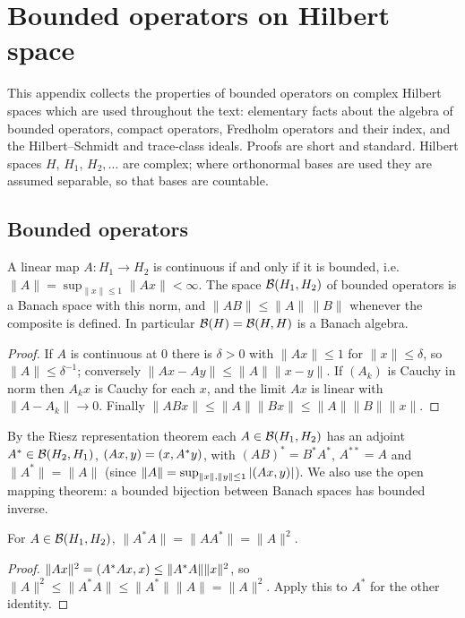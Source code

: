 \chapter{Bounded operators on Hilbert space}\label{ch:hilbert}

This appendix collects the properties of bounded operators on complex Hilbert
spaces which are used throughout the text: elementary facts about the algebra of
bounded operators, compact operators, Fredholm operators and their index, and the
Hilbert--Schmidt and trace-class ideals. Proofs are short and standard. Hilbert
spaces $H$, $H_1$, $H_2,\dots$ are complex; where orthonormal bases are used they are
assumed separable, so that bases are countable.

\section{Bounded operators}\label{hilbert:sec:bounded}

\begin{proposition}\label{hilbert:prop:bounded}
A linear map $A:H_1\to H_2$ is continuous if and only if it is bounded, i.e.\
$\|A\|=\sup_{\|x\|\le1}\|Ax\|<\infty$. The space $\mathcal{B}(H_1,H_2)$ of bounded operators is a
Banach space with this norm, and $\|AB\|\le\|A\|\,\|B\|$ whenever the composite is
defined. In particular $\mathcal{B}(H)=\mathcal{B}(H,H)$ is a Banach algebra.
\end{proposition}
\begin{proof}
If $A$ is continuous at $0$ there is $\delta>0$ with $\|Ax\|\le1$ for $\|x\|\le\delta$, so
$\|A\|\le\delta^{-1}$; conversely $\|Ax-Ay\|\le\|A\|\|x-y\|$. If $(A_k)$ is Cauchy in norm then
$A_kx$ is Cauchy for each $x$, and the limit $Ax$ is linear with $\|A-A_k\|\to0$. Finally
$\|ABx\|\le\|A\|\|Bx\|\le\|A\|\|B\|\|x\|$.
\end{proof}

By the Riesz representation theorem each $A\in\mathcal{B}(H_1,H_2)$ has an adjoint
$A^*\in\mathcal{B}(H_2,H_1)$, $( Ax, y)=( x, A^*y)$, with $(AB)^*=B^*A^*$, $A^{**}=A$ and
$\|A^*\|=\|A\|$ (since $\|A\|=\sup_{\|x\|,\|y\|\le1}|( Ax, y)|$). We also use the open
mapping theorem: a bounded bijection between Banach spaces has bounded inverse.

\begin{proposition}[$C^*$-identity]\label{hilbert:prop:Cstar}
For $A\in\mathcal{B}(H_1,H_2)$, $\|A^*A\|=\|AA^*\|=\|A\|^2$.
\end{proposition}
\begin{proof}
$\|Ax\|^2=( A^*Ax, x)\le\|A^*A\|\|x\|^2$, so $\|A\|^2\le\|A^*A\|\le\|A^*\|\|A\|=\|A\|^2$. Apply this
to $A^*$ for the other identity.
\end{proof}


